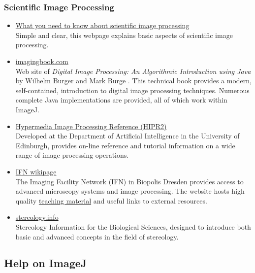 \subsubsection*{Scientific Image Processing\label{sub:IP-Resources}}
\begin{itemize}
\item \href{http://fiji.sc/wiki/index.php/IP_Principles}{What you need to know about scientific image processing}\\
Simple and clear, this  webpage explains
basic aspects of scientific image processing.
\item \href{http://www.imagingbook.com}{imagingbook.com}\\
Web site of \emph{Digital Image Processing: An Algorithmic Introduction
using Java} by Wilhelm Burger and Mark Burge \cite{Burger:2008p14082}.
This technical book provides a modern, self-contained, introduction
to digital image processing techniques. Numerous complete Java implementations
are provided, all of which work within ImageJ.
\item \href{http://homepages.inf.ed.ac.uk/rbf/HIPR2/}{Hypermedia Image Processing Reference (HIPR2)}\\
Developed at the Department of Artificial Intelligence in the University
of Edinburgh, provides on-line reference and tutorial information
on a wide range of image processing operations.
\item \href{https://ifn.mpi-cbg.de/wiki/ifn/index.php/Imaging_Facility_Network}{IFN wikipage}\\
The Imaging Facility Network (IFN) in Biopolis Dresden provides access
to advanced microscopy systems and image processing. The website hosts
high quality \href{https://ifn.mpi-cbg.de/wiki/ifn/index.php/Teaching_Material}{teaching material}
and useful links to external resources.
\item \href{http://www.stereology.info/}{stereology.info} \\
Stereology Information for the Biological Sciences, designed to introduce
both basic and advanced concepts in the field of stereology.
\end{itemize}



\subsection{Help on ImageJ\label{sub:Getting-Help}}

